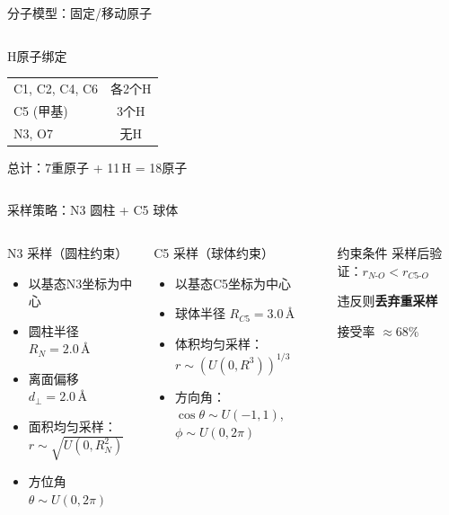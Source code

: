 \documentclass[aspectratio=169,9pt]{beamer}
\newcommand{\AAng}{\,\text{\AA}}
\begin{document}
\begin{frame}{分子模型：固定/移动原子}
\begin{columns}[T]
    \begin{block}{H原子绑定}
      \scriptsize
      \begin{tabular}{@{}lc@{}}
        C1, C2, C4, C6 & 各2个H \\
        C5 (甲基) & 3个H \\
        N3, O7 & 无H \\
      \end{tabular}

      总计：7重原子 + 11\,H = 18原子
    \end{block}
  \end{columns}
\end{frame}

\begin{frame}{采样策略：N3 圆柱 + C5 球体}
  \begin{columns}[T]
    \begin{block}{N3 采样（圆柱约束）}
      \scriptsize
      \begin{itemize}
        \item 以基态N3坐标为中心
        \item 圆柱半径 $R_N = 2.0\AAng$
        \item 离面偏移 $d_\perp = 2.0\AAng$
        \item 面积均匀采样：$r \sim \sqrt{U(0, R_N^2)}$
        \item 方位角 $\theta \sim U(0, 2\pi)$
      \end{itemize}
    \end{block}

    \begin{block}{C5 采样（球体约束）}
      \scriptsize
      \begin{itemize}
        \item 以基态C5坐标为中心
        \item 球体半径 $R_{C5} = 3.0\AAng$
        \item 体积均匀采样：$r \sim (U(0,R^3))^{1/3}$
        \item 方向角：$\cos\theta \sim U(-1,1)$, $\phi \sim U(0,2\pi)$
      \end{itemize}
    \end{block}

    \begin{block}{约束条件}
      \scriptsize
      采样后验证：$r_{N\text{-}O} < r_{C5\text{-}O}$

      违反则\textbf{丢弃重采样}

      接受率 $\approx 68\%$
    \end{block}


\end{columns}
\end{frame}
\end{document}
